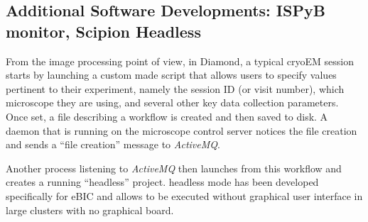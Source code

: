 \subsection{Additional Software Developments: ISPyB monitor, Scipion Headless}

From the image processing point of view, in Diamond, a typical cryoEM session starts by launching a custom made script that  allows users to specify values pertinent to their experiment, namely the session ID (or visit number), which microscope they are using, and several other key data collection parameters. Once set, a file describing a \scipion workflow is created and then saved to disk.
A daemon that is running on the microscope control server notices the file creation and sends a ``file creation'' message to \emph{ActiveMQ}. 

Another process listening to \emph{ActiveMQ} then launches \scipion from this workflow and creates a running ``headless'' project. \scipion headless mode has been developed specifically for eBIC and allows \scipion to be executed without graphical user interface in large clusters with no graphical board. 



